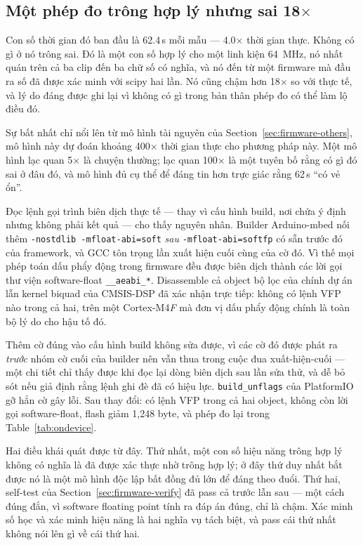 \documentclass[11pt]{article}
\begin{document}
\subsection{Một phép đo trông hợp lý nhưng sai 18$\times$}
\label{sec:firmware-fpu}

Con số thời gian đó ban đầu là 62.4\,\textmu s mỗi mẫu --- 4.0$\times$
thời gian thực. Không có gì ở nó trông sai. Đó là một con số hợp lý cho
một linh kiện 64~MHz, nó nhất quán trên cả ba clip đến ba chữ số có nghĩa,
và nó đến từ một firmware mà đầu ra số đã được xác minh với scipy hai lần.
Nó cũng chậm hơn 18$\times$ so với thực tế, và lý do đáng được ghi lại vì
không có gì trong bản thân phép đo có thể làm lộ điều đó.

Sự bất nhất chỉ nổi lên từ mô hình tài nguyên của
Section~\ref{sec:firmware-others}, mô hình này dự đoán khoảng 400$\times$
thời gian thực cho phương pháp này. Một mô hình lạc quan 5$\times$ là
chuyện thường; lạc quan 100$\times$ là một tuyên bố rằng có gì đó sai ở
đâu đó, và mô hình đủ cụ thể để đáng tin hơn trực giác rằng 62\,\textmu s
``có vẻ ổn''.

Đọc lệnh gọi trình biên dịch thực tế --- thay vì cấu hình build, nơi
chứa ý định nhưng không phải kết quả --- cho thấy nguyên nhân. Builder
Arduino-mbed nối thêm \texttt{-nostdlib -mfloat-abi=soft} \emph{sau}
\texttt{-mfloat-abi=softfp} có sẵn trước đó của framework, và GCC tôn
trọng lần xuất hiện cuối cùng của cờ đó. Vì thế mọi phép toán dấu phẩy
động trong firmware đều được biên dịch thành các lời gọi thư viện
software-float \texttt{\_\_aeabi\_*}. Disassemble cả object bộ lọc của
chính dự án lẫn kernel biquad của CMSIS-DSP đã xác nhận trực tiếp: không
có lệnh VFP nào trong cả hai, trên một Cortex-M4\emph{F} mà đơn vị dấu
phẩy động chính là toàn bộ lý do cho hậu tố đó.

Thêm cờ đúng vào cấu hình build không sửa được, vì các cờ đó được phát ra
\emph{trước} nhóm cờ cuối của builder nên vẫn thua trong cuộc đua
xuất-hiện-cuối --- một chi tiết chỉ thấy được khi đọc lại dòng biên dịch
sau lần sửa thử, và dễ bỏ sót nếu giả định rằng lệnh ghi đè đã có hiệu
lực. \texttt{build\_unflags} của PlatformIO gỡ hẳn cờ gây lỗi. Sau thay
đổi: có lệnh VFP trong cả hai object, không còn lời gọi software-float,
flash giảm 1{,}248 byte, và phép đo lại trong Table~\ref{tab:ondevice}.

Hai điều khái quát được từ đây. Thứ nhất, một con số hiệu năng trông hợp
lý không có nghĩa là đã được xác thực nhờ trông hợp lý; ở đây thứ duy
nhất bắt được nó là một mô hình độc lập bất đồng đủ lớn để đáng theo
đuổi. Thứ hai, self-test của Section~\ref{sec:firmware-verify} đã pass cả
trước lẫn sau --- một cách đúng đắn, vì software floating point tính ra
đáp án đúng, chỉ là chậm. Xác minh số học và xác minh hiệu năng là hai
nghĩa vụ tách biệt, và pass cái thứ nhất không nói lên gì về cái thứ hai.
\end{document}
